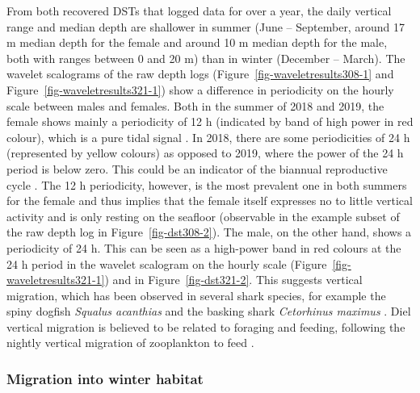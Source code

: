 \documentclass[
  authoryear,
  review,
  3p]{elsarticle}
\begin{document}
From both recovered DSTs that logged data for over a year, the daily
vertical range and median depth are shallower in summer (June --
September, around 17 m median depth for the female and around 10 m
median depth for the male, both with ranges between 0 and 20 m) than in
winter (December -- March). The wavelet scalograms of the raw depth logs
(Figure~\ref{fig-waveletresults308-1} and
Figure~\ref{fig-waveletresults321-1}) show a difference in periodicity
on the hourly scale between males and females. Both in the summer of
2018 and 2019, the female shows mainly a periodicity of 12 h (indicated
by band of high power in red colour), which is a pure tidal signal
\citep[since from one high tide to the next one it takes approximately
12 h, the same holds true for low tide,][]{shepard_2006}. In 2018, there
are some periodicities of 24 h (represented by yellow colours) as
opposed to 2019, where the power of the 24 h period is below zero. This
could be an indicator of the biannual reproductive cycle \citep[with
females feeding when they are not pregnant, and they stop feeding during
the migration to parturition grounds and parturition
itself,][p.~23]{michael_2006}. The 12 h periodicity, however, is the
most prevalent one in both summers for the female and thus implies that
the female itself expresses no to little vertical activity and is only
resting on the seafloor (observable in the example subset of the raw
depth log in Figure~\ref{fig-dst308-2}). The male, on the other hand,
shows a periodicity of 24 h. This can be seen as a high-power band in
red colours at the 24 h period in the wavelet scalogram on the hourly
scale (Figure~\ref{fig-waveletresults321-1}) and in
Figure~\ref{fig-dst321-2}. This suggests vertical migration, which has
been observed in several shark species, for example the spiny dogfish
\emph{Squalus acanthias} \citep{carlson_2014} and the basking shark
\emph{Cetorhinus maximus} \citep{shepard_2006}. Diel vertical migration
is believed to be related to foraging and feeding, following the nightly
vertical migration of zooplankton to feed \citep{griffiths_2020}.

\hypertarget{sec-disc-wintermig}{%
\subsubsection{Migration into winter habitat}\label{sec-disc-wintermig}}
\end{document}
